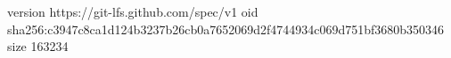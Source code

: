 version https://git-lfs.github.com/spec/v1
oid sha256:c3947c8ca1d124b3237b26cb0a7652069d2f4744934c069d751bf3680b350346
size 163234
